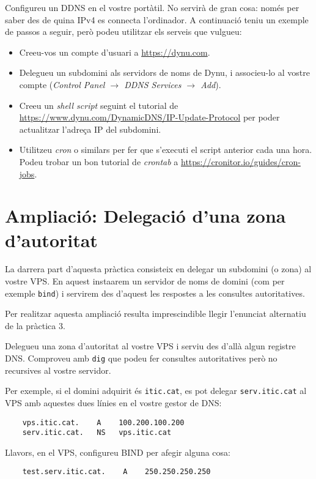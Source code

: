 \documentclass{practicaitic}
\begin{document}
\begin{tasca}
  Configureu un DDNS en el vostre portàtil. No servirà de gran cosa: només per
  saber des de quina IPv4 es connecta l'ordinador. A continuació teniu
  un exemple de passos a seguir, però podeu utilitzar els serveis que vulgueu:

  \begin{itemize}
    \item Creeu-vos un compte d'usuari a \url{https://dynu.com}.
    \item Delegueu un subdomini als servidors de noms de Dynu, i associeu-lo
    al vostre compte (\textit{Control Panel $\to$ DDNS Services $\to$ Add}).
    \item Creeu un \textit{shell script} seguint el tutorial de
    \url{https://www.dynu.com/DynamicDNS/IP-Update-Protocol} per poder
    actualitzar l'adreça IP del subdomini.
    \item Utilitzeu \textit{cron} o similars per fer que s'executi el script
    anterior cada una hora. Podeu trobar un bon tutorial de \textit{crontab}
    a \url{https://cronitor.io/guides/cron-jobs}.
  \end{itemize}
\end{tasca}


\section{Ampliació: Delegació d'una zona d'autoritat}

La darrera part d'aquesta pràctica consisteix en delegar un subdomini (o zona)
al vostre VPS. En aquest insta\lgem arem un servidor de noms de domini
(com per exemple \texttt{bind}) i servirem des d'aquest les respostes
a les consultes autoritatives.

Per realitzar aquesta ampliació resulta imprescindible llegir l'enunciat
alternatiu de la pràctica 3.

\begin{tasca}
  Delegueu una zona d'autoritat al vostre VPS i serviu des d'allà algun
  registre DNS. Comproveu amb \verb|dig| que podeu fer consultes
  autoritatives però no recursives al vostre servidor.

  Per exemple, si el domini adquirit és \texttt{itic.cat}, es pot delegar
  \texttt{serv.itic.cat} al VPS amb aquestes dues línies en el vostre gestor
  de DNS:

  \begin{verbatim}
    vps.itic.cat.    A    100.200.100.200
    serv.itic.cat.   NS   vps.itic.cat
  \end{verbatim}

  Llavors, en el VPS, configureu BIND per afegir alguna cosa:

  \begin{verbatim}
    test.serv.itic.cat.    A    250.250.250.250
  \end{verbatim}
\end{tasca}
\end{document}
